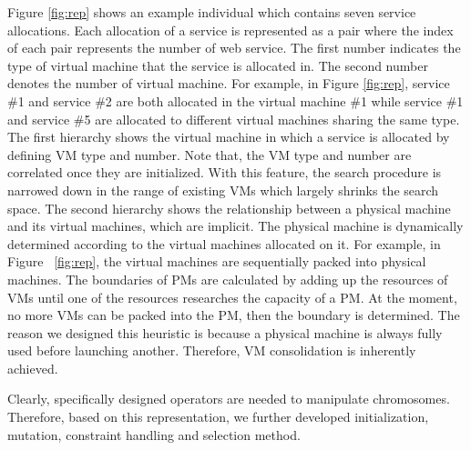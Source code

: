 Figure \ref{fig:rep} shows an example individual which contains seven service allocations. Each allocation of a service is represented as a pair where the index of each pair represents the number of web service. The first number indicates the type of virtual machine that the service is allocated in. The second number denotes the number of virtual machine.  For example, in Figure \ref{fig:rep}, service \#1 and service \#2 are both allocated in the virtual machine \#1 while service \#1 and service \#5 are allocated to different virtual machines sharing the same type.
The first hierarchy shows the virtual machine in which a service is allocated by defining VM type and number. 
Note that, the VM type and number are correlated once they are initialized. 
With this feature, the search procedure is narrowed down in the range of existing VMs which largely shrinks the search space.
The second hierarchy shows the relationship between a physical machine and its virtual machines, which are implicit. The physical machine is dynamically determined according to the virtual machines allocated on it. 
For example, in Figure ~\ref{fig:rep}, the virtual machines are 
sequentially packed into physical machines. The boundaries of PMs are calculated by adding up the resources of VMs until one of the resources researches the capacity of a PM. At the moment, no more VMs can be packed into the PM, then the boundary is determined.
The reason we designed this heuristic is because a physical machine is always fully used before launching another. Therefore, VM consolidation is inherently achieved.

Clearly, specifically designed operators are needed to manipulate chromosomes. Therefore, based on this representation, we further developed initialization, mutation, constraint handling and selection method.

